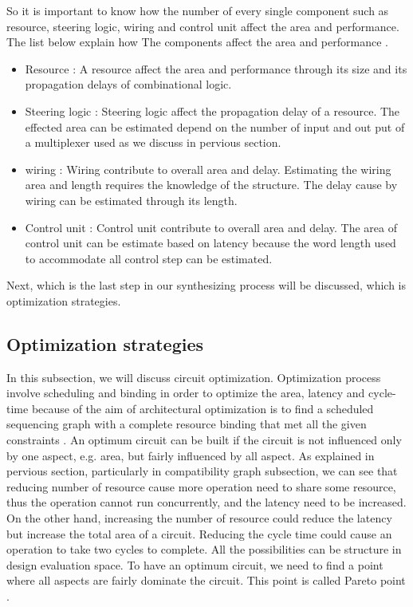 So it is important to know how the number of every single component such as resource, steering logic, wiring and control unit affect the area and performance. The list below explain how The components affect the area and performance \cite{main}.

\begin{itemize}
    \item Resource : A resource affect the area and performance through its size and its propagation delays of combinational logic.
    \item Steering logic : Steering logic affect the propagation delay of a resource. The effected area can be estimated depend on the number of input and out put of a multiplexer used as we discuss in pervious section. 
    \item wiring : Wiring contribute to overall area and delay. Estimating the wiring area and length requires the knowledge of the structure. The delay cause by wiring can be estimated through its length.
    \item Control unit : Control unit contribute to overall area and delay. The area of control unit can be estimate based on latency because the word length used to accommodate all control step can be estimated.
\end{itemize}

Next, which is the last step in our synthesizing process will be discussed, which is optimization strategies.

\subsection{Optimization strategies}

In this subsection, we will discuss circuit optimization. Optimization process involve scheduling and binding in order to optimize the area, latency and cycle-time because of the aim of architectural optimization is to find a scheduled sequencing graph with a complete resource binding that met all the given constraints \cite{main}. An optimum circuit can be built if the circuit is not influenced only by one aspect, e.g. area, but fairly influenced by all aspect. As explained in pervious section, particularly in compatibility graph subsection, we can see that reducing number of resource cause more operation need to share some resource, thus the operation cannot run concurrently, and the latency need to be increased. On the other hand, increasing the number of resource could reduce the latency but increase the total area of a circuit. Reducing the cycle time could cause an operation to take two cycles to complete. All the possibilities can be structure in design evaluation space. To have an optimum circuit, we need to find a point where all aspects are fairly dominate the circuit. This point is called Pareto point \cite{main}.


